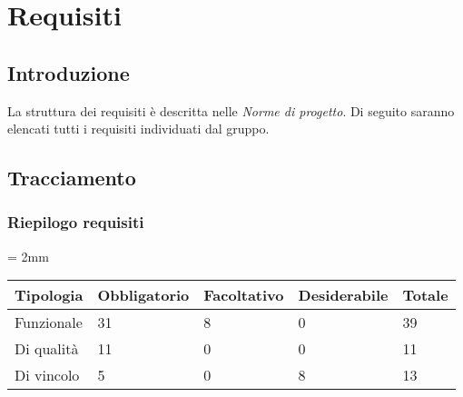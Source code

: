 \section{Requisiti}

    \subsection{Introduzione}
    La struttura dei requisiti è descritta nelle \emph{Norme di progetto}. Di seguito saranno elencati tutti i requisiti individuati dal gruppo. 
    
    
    
    
    
    
    \subsection{Tracciamento}
    
    
    \subsubsection{Riepilogo requisiti}
    
    \tabulinesep = 2mm %
    \begin{longtabu} to \textwidth {| X | X | X | X | X |} %
    \hline
        
    \textbf{Tipologia} & \textbf{Obbligatorio} & \textbf{Facoltativo} & \textbf{Desiderabile} & \textbf{Totale} \\
    \hline
    Funzionale & 31 & 8 & 0 & 39\\
    \hline
    Di qualità & 11 & 0 & 0 & 11\\
    \hline
    Di vincolo & 5 & 0 & 8 & 13\\
    \hline
    
    \end{longtabu}






